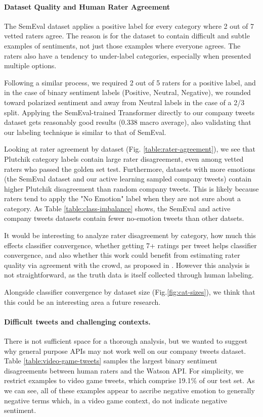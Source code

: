 \documentclass[letterpaper]{article} %
\begin{document}
\paragraph{Dataset Quality and Human Rater Agreement}
The SemEval dataset \cite{SemEval2018Task1} applies a positive label for every category where 2 out of 7 vetted raters agree. The reason is for the dataset to contain difficult and subtle examples of sentiments, not just those examples where everyone agrees. The raters also have a tendency to under-label categories, especially when presented multiple options. 

Following a similar process, we required 2 out of 5 raters for a positive label, and in the case of binary sentiment labels (Positive, Neutral, Negative), we rounded toward polarized sentiment and away from Neutral labels in the case of a 2/3 split. Applying the SemEval-trained Transformer directly to our company tweets dataset gets reasonably good results (0.338 macro average), also validating that our labeling technique is similar to that of SemEval.   

Looking at rater agreement by dataset (Fig. \ref{table:rater-agreement}), we see that Plutchik category labels contain large rater disagreement, even among vetted raters who passed the golden set test. Furthermore, datasets with more emotions (the SemEval dataset and our active learning sampled company tweets) contain higher Plutchik disagreement than random company tweets. This is likely because raters tend to apply the "No Emotion" label when they are not sure about a category. As Table \ref{table:class-imbalance} shows, the SemEval and active company tweets datasets contain fewer no-emotion tweets than other datsets.

It would be interesting to analyze rater disagreement by category, how much this effects classifier convergence, whether getting 7+ ratings per tweet helps classifier convergence, and also whether this work could benefit from estimating rater quality via agreement with the crowd, as proposed in \cite{NoisyLabelHumanAWS2017}. However this analysis is not straightforward, as the truth data is itself collected through human labeling. 

Alongside classifier convergence by dataset size (Fig.\ref{fig:cat-sizes}), we think that this could be an interesting area a future research.


\paragraph{Difficult tweets and challenging contexts.}
There is not sufficient space for a thorough analysis, but we wanted to suggest why general purpose APIs may not work well on our company tweets dataset. Table \ref{table:video-game-tweets} samples the largest binary sentiment disagreements between human raters and the Watson API. For simplicity, we restrict examples to video game tweets, which comprise 19.1\% of our test set. As we can see, all of these examples appear to ascribe negative emotion to generally negative terms which, in a video game context, do not indicate negative sentiment.
\end{document}
